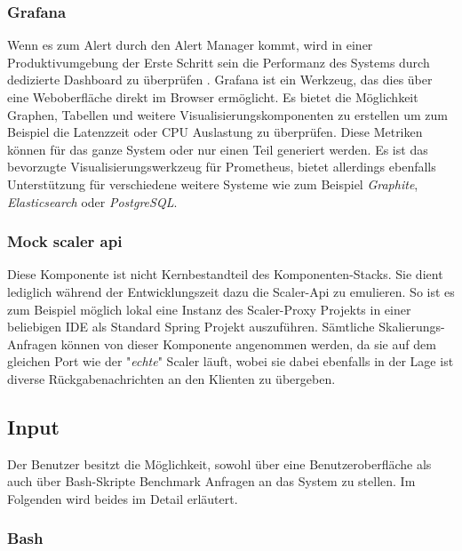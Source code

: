 \subsubsection{Grafana \checkmark}
Wenn es zum Alert durch den Alert Manager kommt, wird in einer Produktivumgebung der Erste Schritt sein die Performanz des Systems durch dedizierte Dashboard zu überprüfen \cite[Seite~97]{oreillyPrometheus}. Grafana ist ein Werkzeug, das dies über eine Weboberfläche direkt im Browser ermöglicht. Es bietet die Möglichkeit Graphen, Tabellen und weitere Visualisierungskomponenten zu erstellen um zum Beispiel die Latenzzeit oder CPU Auslastung zu überprüfen. Diese Metriken können für das ganze System oder nur einen Teil generiert werden. Es ist das bevorzugte Visualisierungswerkzeug für Prometheus, bietet allerdings ebenfalls Unterstützung für verschiedene weitere Systeme wie zum Beispiel \emph{Graphite}, \emph{Elasticsearch} oder \emph{PostgreSQL}.


\subsubsection{Mock scaler api \checkmark}
Diese Komponente ist nicht Kernbestandteil des Komponenten-Stacks. Sie dient lediglich während der Entwicklungszeit dazu die Scaler-Api zu emulieren. So ist es zum Beispiel möglich lokal eine Instanz des Scaler-Proxy Projekts in einer beliebigen IDE als Standard Spring Projekt auszuführen. Sämtliche Skalierungs-Anfragen können von dieser Komponente angenommen werden, da sie auf dem gleichen Port wie der "\emph{echte}" Scaler läuft, wobei sie dabei ebenfalls in der Lage ist diverse Rückgabenachrichten an den Klienten zu übergeben.




\subsection{Input \checkmark}

Der Benutzer besitzt die Möglichkeit, sowohl über eine Benutzeroberfläche als auch über Bash-Skripte Benchmark Anfragen an das System zu stellen. Im Folgenden wird beides im Detail erläutert.

\subsubsection{Bash \checkmark}
